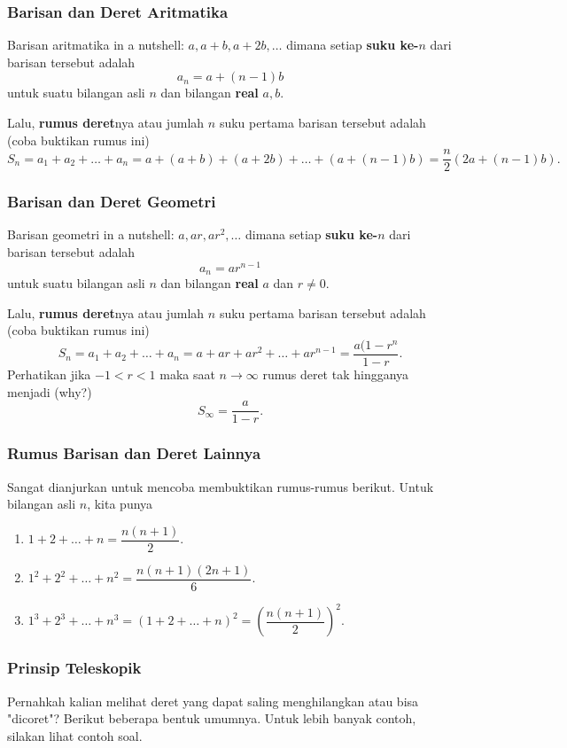 \documentclass[11pt]{scrartcl}
\begin{document}
    
    \subsubsection{Barisan dan Deret Aritmatika}
    Barisan aritmatika in a nutshell: $a,a+b,a+2b,\dots$ dimana setiap \textbf{suku ke-$n$} dari barisan tersebut adalah $$a_n=a+(n-1)b$$ untuk suatu bilangan asli $n$ dan bilangan \textbf{real} $a,b$.
    
    Lalu, \textbf{rumus deret}nya atau jumlah $n$ suku pertama barisan tersebut adalah (coba buktikan rumus ini) $$S_n = a_1+a_2+\dots+a_n=a+(a+b)+(a+2b)+\dots+(a+(n-1)b)=\dfrac{n}{2}(2a+(n-1)b).$$
    
    \subsubsection{Barisan dan Deret Geometri}
     Barisan geometri in a nutshell: $a,ar,ar^2,\dots$ dimana setiap \textbf{suku ke-$n$} dari barisan tersebut adalah $$a_n=ar^{n-1}$$ untuk suatu bilangan asli $n$ dan bilangan \textbf{real} $a$ dan $r \neq 0$.
    
    Lalu, \textbf{rumus deret}nya atau jumlah $n$ suku pertama barisan tersebut adalah (coba buktikan rumus ini) $$S_n = a_1+a_2+\dots+a_n=a+ar+ar^2+\dots+ar^{n-1}=\dfrac{a(1-r^n}{1-r}.$$
    Perhatikan jika $-1 < r < 1$ maka saat $n \rightarrow \infty$ rumus deret tak hingganya menjadi (why?) $$S_\infty =  \dfrac{a}{1-r}.$$
    
    \subsubsection{Rumus Barisan dan Deret Lainnya}
    Sangat dianjurkan untuk mencoba membuktikan rumus-rumus berikut. Untuk bilangan asli $n$, kita punya
    \begin{enumerate}
        \item $1+2+\dots+n = \dfrac{n(n+1)}{2}.$
        \item $1^2+2^2+\dots+n^2 = \dfrac{n(n+1)(2n+1)}{6}.$
        \item $1^3+2^3+\dots+n^3 = \left(1+2+\dots+n\right)^2= \left(\dfrac{n(n+1)}{2}\right)^2.$
    \end{enumerate}
    
    \subsubsection{Prinsip Teleskopik}
    Pernahkah kalian melihat deret yang dapat saling menghilangkan atau bisa "dicoret"? Berikut beberapa bentuk umumnya. Untuk lebih banyak contoh, silakan lihat contoh soal.
    
\end{document}
